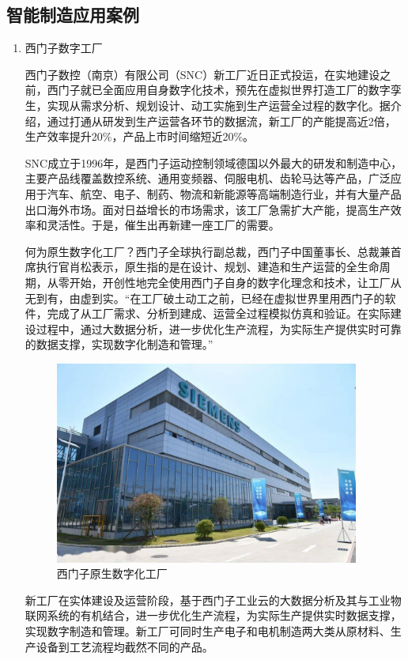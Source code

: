 \documentclass[lang=cn,12pt,bibtex,newtx,twoside,margintrue,citestyle=gb7714-2015, bibstyle=gb7714-2015]{elegantbook}
\begin{document}
\subsection{智能制造应用案例}
\label{sec:org9012b0d}
\begin{enumerate}
\item 西门子数字工厂
\label{sec:orgd08290a}

\setlength{\parindent}{2em}
西门子数控（南京）有限公司（SNC）新工厂近日正式投运，在实地建设之前，西门子就已全面应用自身数字化技术，预先在虚拟世界打造工厂的数字孪生，实现从需求分析、规划设计、动工实施到生产运营全过程的数字化。据介绍，通过打通从研发到生产运营各环节的数据流，新工厂的产能提高近2倍，生产效率提升20\%，产品上市时间缩短近20\%。

SNC成立于1996年，是西门子运动控制领域德国以外最大的研发和制造中心，主要产品线覆盖数控系统、通用变频器、伺服电机、齿轮马达等产品，广泛应用于汽车、航空、电子、制药、物流和新能源等高端制造行业，并有大量产品出口海外市场。面对日益增长的市场需求，该工厂急需扩大产能，提高生产效率和灵活性。于是，催生出再新建一座工厂的需要。

何为原生数字化工厂？西门子全球执行副总裁，西门子中国董事长、总裁兼首席执行官肖松表示，原生指的是在设计、规划、建造和生产运营的全生命周期，从零开始，开创性地完全使用西门子自身的数字化理念和技术，让工厂从无到有，由虚到实。“在工厂破土动工之前，已经在虚拟世界里用西门子的软件，完成了从工厂需求、分析到建成、运营全过程模拟仿真和验证。在实际建设过程中，通过大数据分析，进一步优化生产流程，为实际生产提供实时可靠的数据支撑，实现数字化制造和管理。”

\begin{figure}[htbp]
\centering
\includegraphics[angle=0,width=10cm]{./figure/4.4.jpg}
\caption{\label{4.4}西门子原生数字化工厂}
\end{figure}


新工厂在实体建设及运营阶段，基于西门子工业云的大数据分析及其与工业物联网系统的有机结合，进一步优化生产流程，为实际生产提供实时数据支撑，实现数字制造和管理。新工厂可同时生产电子和电机制造两大类从原材料、生产设备到工艺流程均截然不同的产品。


\end{enumerate}
\end{document}
